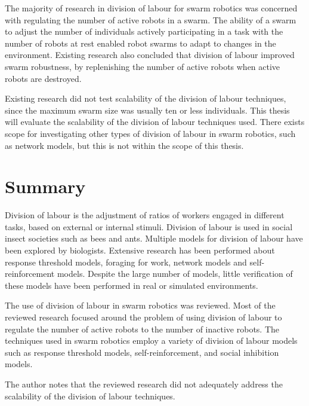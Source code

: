 The majority of research in division of labour for swarm robotics was concerned with regulating the number of active robots in a swarm. The ability of a swarm to adjust the number of individuals actively participating in a task with the number of robots at rest enabled robot swarms to adapt to changes in the environment. Existing research also concluded that division of labour improved swarm robustness, by replenishing the number of active robots when active robots are destroyed. 

Existing research did not test scalability of the division of labour techniques, since the maximum swarm size was usually ten or less individuals. This thesis will evaluate the scalability of the division of labour techniques used. There exists scope for investigating other types of division of labour in swarm robotics, such as network models, but this is not within the scope of this thesis. 


\section{Summary}
\label{sec:second:summary}
Division of labour is the adjustment of ratios of workers engaged in different tasks, based on external or internal stimuli. Division of labour is used in social insect societies such as bees and ants. Multiple models for division of labour have been explored by biologists. Extensive research has been performed about response threshold models, foraging for work, network models and self-reinforcement models. Despite the large number of models, little verification of these models have been performed in real or simulated environments. 

The use of division of labour in swarm robotics was reviewed. Most of the reviewed research focused around the problem of using division of labour to regulate the number of active robots to the number of inactive robots. The techniques used in swarm robotics employ a variety of division of labour models such as response threshold models, self-reinforcement, and social inhibition models. 

The author notes that the reviewed research did not adequately address the scalability of the division of labour techniques.
